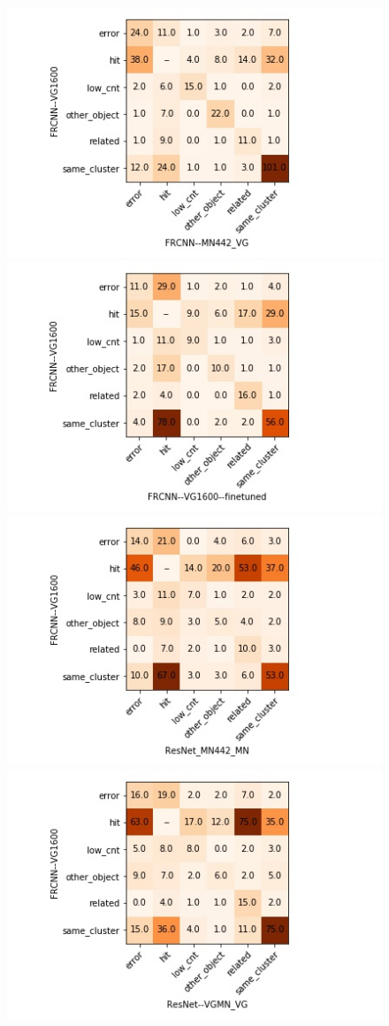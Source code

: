 \begin{figure}[t]
\includegraphics[scale=.5]{images/FRCNN-1600-442_change_matrix.jpg}
\includegraphics[scale=.5]{images/FRCNN_change_matrix.jpg}
\includegraphics[scale=.5]{images/FRCNN-ResNet_change_matrix.jpg}
\includegraphics[scale=.5]{images/FRCNN-ResNet-VG_change_matrix.jpg}


\end{figure}
